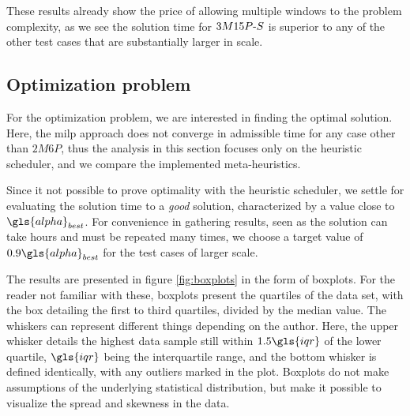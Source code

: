 \documentclass[main.tex]{subfiles}
\begin{document}
These results already show the price of allowing multiple windows to the problem complexity, as we see the solution time for $3M15P\text{-} S$ is superior to any of the other test cases that are substantially larger in scale.

\subsection{Optimization problem}

For the optimization problem, we are interested in finding the optimal solution.
Here, the \gls{milp} approach does not converge in admissible time for any case other than $2M6P$, thus the analysis in this section focuses only on the heuristic scheduler, and we compare the implemented meta-heuristics.

Since it not possible to prove optimality with the heuristic scheduler, we settle for evaluating the solution time to a \textit{good} solution, characterized by a value close to $\gls{alpha}_{best}$.
For convenience in gathering results, seen as the solution can take hours and must be repeated many times, we choose a target value of $0.9\gls{alpha}_{best}$ for the test cases of larger scale.

The results are presented in figure \ref{fig:boxplots} in the form of boxplots.
For the reader not familiar with these, boxplots present the quartiles of the data set, with the box detailing the first to third quartiles, divided by the median value.
The whiskers can represent different things depending on the author. 
Here, the upper whisker details the highest data sample still within $1.5\gls{iqr}$ of the lower quartile, $\gls{iqr}$ being the interquartile range, and the bottom whisker is defined identically, with any outliers marked in the plot.
Boxplots do not make assumptions of the underlying statistical distribution, but make it possible to visualize the spread and skewness in the data.
\end{document}
